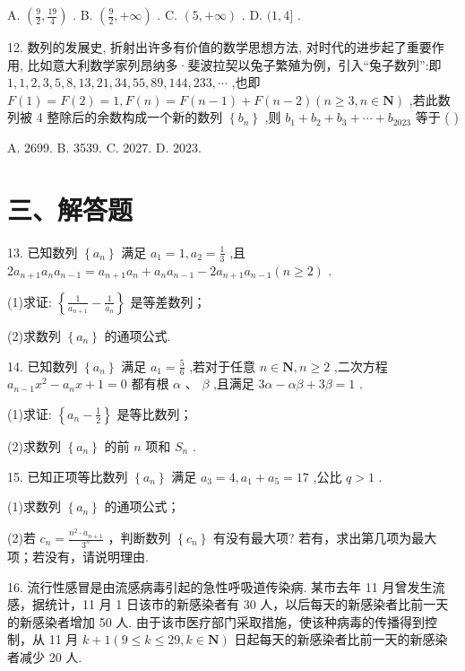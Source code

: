A. $\left( {\frac{9}{2},\frac{19}{4}}\right)$ . B. $\left( {\frac{9}{2}, + \infty }\right)$ . C. $\left( {5, + \infty }\right)$ . D. $(1,4\rbrack$ .

12. 数列的发展史, 折射出许多有价值的数学思想方法, 对时代的进步起了重要作用, 比如意大利数学家列昂纳多·斐波拉契以兔子繁殖为例，引入“兔子数列”:即 $1,1,2,3,5,8,{13},{21},{34},{55},{89},{144},{233},\cdots$ ,也即 $F\left( 1\right)  = F\left( 2\right)  = 1,F\left( n\right)  = F\left( {n - 1}\right)  + F\left( {n - 2}\right) \left( {n \geq  3,n \in  \mathbf{N}}\right)$ ,若此数列被 4 整除后的余数构成一个新的数列 $\left\{  {b}_{n}\right\}$ ,则 ${b}_{1} + {b}_{2} + {b}_{3} + \cdots  + {b}_{2023}$ 等于 ( )

A. 2699. B. 3539. C. 2027. D. 2023.

\section*{三、解答题}

13. 已知数列 $\left\{  {a}_{n}\right\}$ 满足 ${a}_{1} = 1,{a}_{2} = \frac{1}{3}$ ,且 $2{a}_{n + 1}{a}_{n}{a}_{n - 1} = {a}_{n + 1}{a}_{n} + {a}_{n}{a}_{n - 1} - 2{a}_{n + 1}{a}_{n - 1}\left( {n \geq  2}\right)$ .

(1)求证: $\left\{  {\frac{1}{{a}_{n + 1}} - \frac{1}{{a}_{n}}}\right\}$ 是等差数列；

(2)求数列 $\left\{  {a}_{n}\right\}$ 的通项公式.

14. 已知数列 $\left\{  {a}_{n}\right\}$ 满足 ${a}_{1} = \frac{5}{6}$ ,若对于任意 $n \in  \mathbf{N},n \geq  2$ ,二次方程 ${a}_{n - 1}{x}^{2} - {a}_{n}x + 1 = 0$ 都有根 $\alpha$ 、 $\beta$ ,且满足 ${3\alpha } - {\alpha \beta } + {3\beta } = 1$ .

(1)求证: $\left\{  {{a}_{n} - \frac{1}{2}}\right\}$ 是等比数列；

(2)求数列 $\left\{  {a}_{n}\right\}$ 的前 $n$ 项和 ${S}_{n}$ .

15. 已知正项等比数列 $\left\{  {a}_{n}\right\}$ 满足 ${a}_{3} = 4,{a}_{1} + {a}_{5} = {17}$ ,公比 $q > 1$ .

(1)求数列 $\left\{  {a}_{n}\right\}$ 的通项公式；

(2)若 ${c}_{n} = \frac{{n}^{2} \cdot  {a}_{n + 1}}{{3}^{n}}$ ，判断数列 $\left\{  {c}_{n}\right\}$ 有没有最大项? 若有，求出第几项为最大项；若没有，请说明理由.

16. 流行性感冒是由流感病毒引起的急性呼吸道传染病. 某市去年 11 月曾发生流感，据统计，11 月 1 日该市的新感染者有 30 人，以后每天的新感染者比前一天的新感染者增加 50 人. 由于该市医疗部门采取措施，使该种病毒的传播得到控制，从 11 月 $k + 1\left( {9 \leq  k \leq  {29},k \in  \mathbf{N}}\right)$ 日起每天的新感染者比前一天的新感染者减少 20 人.

